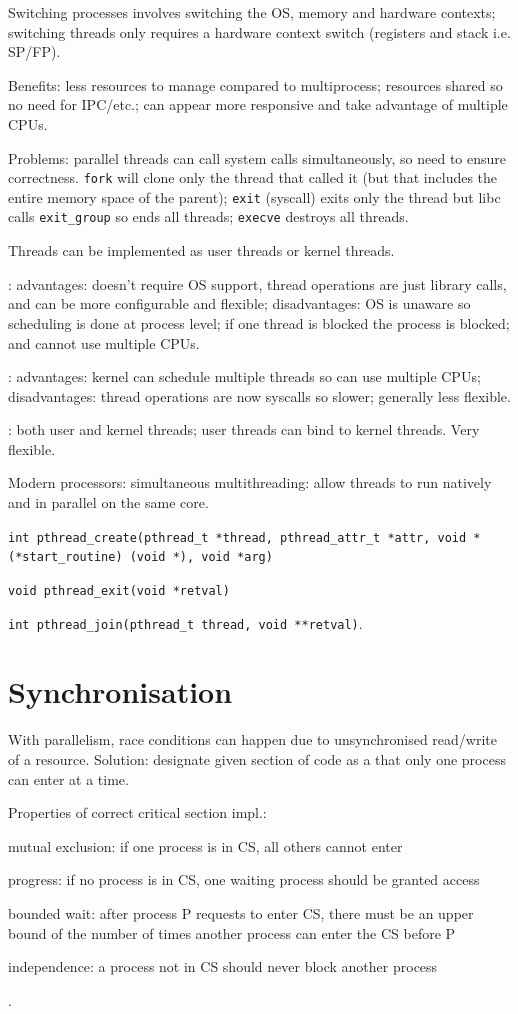 \documentclass[fontsize=9pt]{slnotes}
\begin{document}
Switching processes involves switching the OS, memory and hardware contexts; switching threads only requires a hardware context switch (registers and stack i.e. SP/FP).

Benefits: less resources to manage compared to multiprocess; resources shared so no need for IPC/etc.; can appear more responsive and take advantage of multiple CPUs.

Problems: parallel threads can call system calls simultaneously, so need to ensure correctness. \texttt{fork} will clone only the thread that called it (but that includes the entire memory space of the parent); \texttt{exit} (syscall) exits only the thread but libc calls \texttt{exit\_group} so ends all threads; \texttt{execve} destroys all threads.

Threads can be implemented as user threads or kernel threads.

: advantages: doesn't require OS support, thread operations are just library calls, and can be more configurable and flexible; disadvantages: OS is unaware so scheduling is done at process level; if one thread is blocked the process is blocked; and cannot use multiple CPUs.

: advantages: kernel can schedule multiple threads so can use multiple CPUs; disadvantages: thread operations are now syscalls so slower; generally less flexible.

: both user and kernel threads; user threads can bind to kernel threads. Very flexible.

Modern processors: simultaneous multithreading: allow threads to run natively and in parallel on the same core.

\texttt{int pthread\_create(pthread\_t *thread, pthread\_attr\_t *attr, void *(*start\_routine) (void *), void *arg)}

\texttt{void pthread\_exit(void *retval)}

\texttt{int pthread\_join(pthread\_t thread, void **retval)}.

\chapter{Synchronisation}
With parallelism, race conditions can happen due to unsynchronised read/write of a resource. Solution: designate given section of code as a  that only one process can enter at a time.

Properties of correct critical section impl.: \begin{slinenum}
\item mutual exclusion: if one process is in CS, all others cannot enter
\item progress: if no process is in CS, one waiting process should be granted access
\item bounded wait: after process P requests to enter CS, there must be an upper bound of the number of times another process can enter the CS before P
\item independence: a process not in CS should never block another process
\end{slinenum}.
\end{document}
